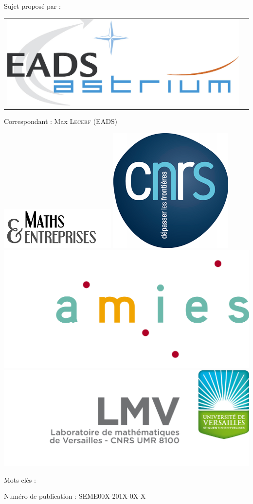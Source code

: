 \documentclass[a4paper,11pt]{article}
\numberwithin{section}{part}
\begin{document}
\hspace{1cm}Sujet propos\'e par :
\begin{center}
\begin{tabular}{cc}
\includegraphics[scale=.4]{LOGO_EADS_ASTRIUM.jpg} 
\end{tabular}
\end{center}
\begin{center}
  \large \sffamily Correspondant : Max \textsc{Lecerf} (EADS)
\end{center}
\vfill
\vspace{3cm}
\includegraphics[width=0.27\linewidth]{logo_GDR_ME} \hfill
\includegraphics[width=0.12\linewidth]{logo_CNRS} \hfill
\includegraphics[width=0.27\linewidth]{logo_AMIES} \hfill
\includegraphics[width=0.30\linewidth]{logo_LMV}
\let\textsc\oldtextsc

\newpage
 \setcounter{page}{0}
\thispagestyle{empty}
\begin{center}

\vfill
Mots clés :

\vfill
Num\'ero de publication : SEME00X-201X-0X-X
\end{center}
\newpage
\end{document}
